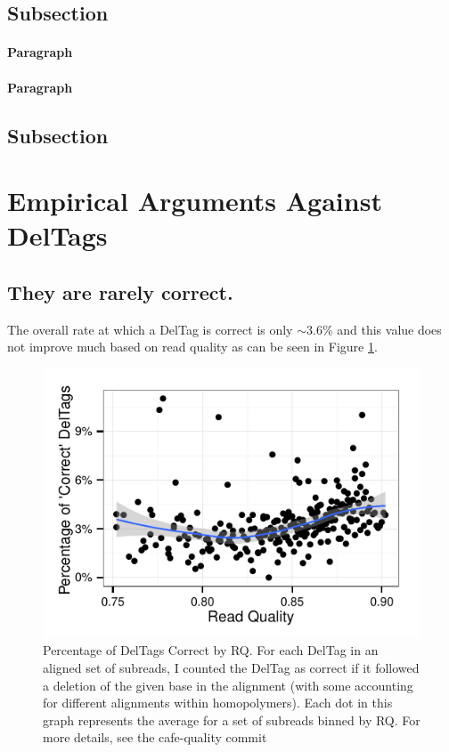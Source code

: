 \documentclass[fleqn,10pt]{SelfArx} %
\begin{document}
\subsection{Subsection}

\lipsum[6] %

\paragraph{Paragraph} \lipsum[7] %
\paragraph{Paragraph} \lipsum[8] %

\subsection{Subsection}

\lipsum[9] %





\section{Empirical Arguments Against DelTags}

\subsection{They are rarely correct.}

The overall rate at which a DelTag is correct is only $\sim3.6\%$ and this value does not improve much based on read quality as can be seen in Figure \ref{fig:rateCorrect}.  


\begin{figure}[ht]\centering
\includegraphics[width=\linewidth]{TagCorrectRateByRQ.pdf}
\caption{Percentage of DelTags Correct by RQ.  For each DelTag in an aligned set of subreads, I counted the DelTag as correct if it followed a deletion of the given base in the alignment (with some accounting for different alignments within homopolymers).  Each dot in this graph represents the average for a set of subreads binned by RQ. For more details, see the cafe-quality commit  }
\label{fig:rateCorrect}
\end{figure}
\end{document}
